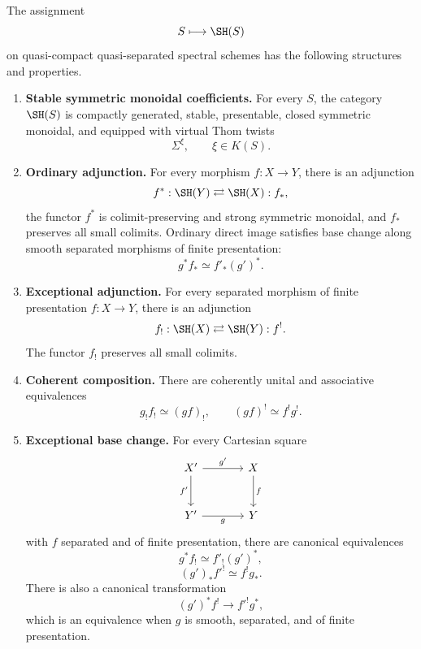 \begin{theorem}
\label{thm:coherent-six-operations}
The assignment
\[
    S\longmapsto\SH(S)
\]
on quasi-compact quasi-separated spectral schemes has the following
structures and properties.

\begin{enumerate}
    \item \textbf{Stable symmetric monoidal coefficients.}
    For every \(S\), the category \(\SH(S)\) is compactly generated,
    stable, presentable, closed symmetric monoidal, and equipped with virtual
    Thom twists
    \[
        \Sigma^\xi,
        \qquad
        \xi\in K(S).
    \]

    \item \textbf{Ordinary adjunction.}
    For every morphism \(f:X\to Y\), there is an adjunction
    \[
        f^*:\SH(Y)
        \rightleftarrows
        \SH(X):f_*,
    \]
    the functor \(f^*\) is colimit-preserving and strong symmetric
    monoidal, and \(f_*\) preserves all small colimits.  Ordinary direct
    image satisfies base change along smooth separated morphisms of finite
    presentation:
    \[
        g^*f_*
        \simeq
        f'_*(g')^*.
    \]

    \item \textbf{Exceptional adjunction.}
    For every separated morphism of finite presentation
    \(f:X\to Y\), there is an adjunction
    \[
        f_!:\SH(X)
        \rightleftarrows
        \SH(Y):f^!.
    \]
    The functor \(f_!\) preserves all small colimits.

    \item \textbf{Coherent composition.}
    There are coherently unital and associative equivalences
    \[
        g_!f_!\simeq(gf)_!,
        \qquad
        (gf)^!\simeq f^!g^!.
    \]

    \item \textbf{Exceptional base change.}
    For every Cartesian square
    \[
    \begin{tikzcd}[column sep=large,row sep=large]
        X' \arrow[r,"g'"] \arrow[d,"f'"']
            & X \arrow[d,"f"] \\
        Y' \arrow[r,"g"']
            & Y
    \end{tikzcd}
    \]
    with \(f\) separated and of finite presentation, there are canonical
    equivalences
    \[
        g^*f_!
        \simeq
        f'_!(g')^*,
    \]
    \[
        (g')_*f'^!
        \simeq
        f^!g_*.
    \]
    There is also a canonical transformation
    \[
        (g')^*f^!
        \longrightarrow
        f'^!g^*,
    \]
    which is an equivalence when \(g\) is smooth, separated, and of finite
    presentation.


\end{enumerate}
\end{theorem}
